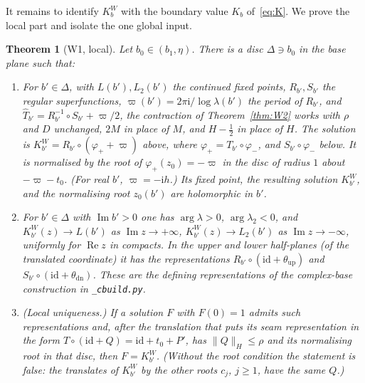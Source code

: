 \documentclass[11pt,a4paper]{article}
\newtheorem{theorem}{Theorem}
\theoremstyle{definition}
\newcommand{\Rr}{R}
\newcommand{\Kk}{K}
\newcommand{\ii}{\mathrm{i}}
\begin{document}
It remains to identify $\Kk^W_b$ with the boundary value $\Kk_b$
of~\eqref{eq:K}.  We prove the local part and isolate the one global input.

\begin{theorem}[W1, local]\label{thm:W1}
Let $b_0\in(b_1,\eta)$.  There is a disc $\Delta\ni b_0$ in the base plane such
that:
\begin{enumerate}
\item For $b'\in\Delta$, with $L(b'),L_2(b')$ the continued fixed points,
  $\Rr_{b'},S_{b'}$ the regular superfunctions, $\varpi(b')=2\pi\ii/\log\lambda(b')$
  the period of $\Rr_{b'}$, and $\hat T_{b'}=\Rr_{b'}^{-1}\circ S_{b'}+\varpi/2$,
  the contraction of Theorem~\ref{thm:W2} works with $\rho$ and $D$
  unchanged, $2M$ in place of $M$, and $H-\tfrac12$ in place of $H$.  The solution is
  $\Kk^W_{b'}=\Rr_{b'}\circ(\varphi_++\varpi)$ above, where
  $\varphi_+=T_{b'}\circ\varphi_-$, and $S_{b'}\circ\varphi_-$ below.  It is
  normalised by the root of $\varphi_+(z_0)=-\varpi$ in the disc of radius $1$
  about $-\varpi-t_0$.  (For real $b'$, $\varpi=-\ii h$.)
  Its fixed point, the resulting solution $\Kk^W_{b'}$, and the normalising root
  $z_0(b')$ are holomorphic in $b'$.
\item For $b'\in\Delta$ with $\operatorname{Im}b'>0$ one has $\arg\lambda>0$,
  $\arg\lambda_2<0$, and $\Kk^W_{b'}(z)\to L(b')$ as $\operatorname{Im}z\to+\infty$,
  $\Kk^W_{b'}(z)\to L_2(b')$ as $\operatorname{Im}z\to-\infty$, uniformly for
  $\operatorname{Re}z$ in compacts.  In the upper and lower half-planes (of
  the translated coordinate) it has the representations
  $\Rr_{b'}\circ(\mathrm{id}+\theta_{\mathrm{up}})$ and
  $S_{b'}\circ(\mathrm{id}+\theta_{\mathrm{dn}})$.  These are the defining
  representations of the complex-base construction in \texttt{\_cbuild.py}.
\item (Local uniqueness.)  If a solution $F$ with $F(0)=1$ admits such
  representations and, after the translation that puts its seam
  representation in the form $T\circ(\mathrm{id}+Q)=\mathrm{id}+t_0+P'$, has
  $\|Q\|_H\le\rho$ and its normalising root in that disc, then
  $F=\Kk^W_{b'}$.  (Without the root condition the statement is false: the
  translates of $\Kk^W_{b'}$ by the other roots $c_j$, $j\ge1$, have the same $Q$.)
\end{enumerate}
\end{theorem}
\end{document}
